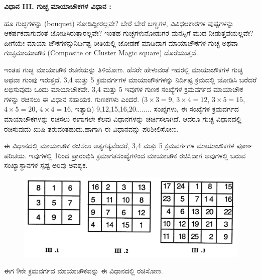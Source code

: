 \newpage

\smallskip
\textbf{ವಿಧಾನ III. ಗುಚ್ಛ ಮಾಯಾಚೌಕಗಳ ವಿಧಾನ :}
\smallskip

ಹೂ ಗುಚ್ಛಗಳನ್ನು (bouquet) ನೋಡಿದ್ದೀರಲ್ಲವೇ? ಬೇರೆ ಬೇರೆ ಬಣ್ಣಗಳ, ವಿವಿಧ\break ಆಕಾರಗಳ ಪುಷ್ಪಗಳನ್ನು ಆಕರ್ಷಕವಾಗುವಂತೆ ಜೋಡಿಸಿರುತ್ತಾರಲ್ಲವೇ? ಇಂತಹ ಗುಚ್ಛಗಳು\break ನೋಡುಗರ ಮನಸ್ಸಿಗೆ ಮುದ ನೀಡುತ್ತವೆಯಲ್ಲವೇ? ಹೀಗೆಯೇ ಮಾಯಾ ಚೌಕ\-ಗಳನ್ನು\break ನಿರ್ದಿಷ್ಟ ರೀತಿಯಲ್ಲಿ ಜೋಡಣೆ ಮಾಡಿದಾಗ ಮಾಯಾಚೌಕಗಳ ಗುಚ್ಛ ಅಥವಾ ಗುಚ್ಛ\break ಮಾಯಾಚೌಕ (Composite or Cluster Magic square) ದೊರೆಯುತ್ತದೆ.

ಇಂತಹ ಗುಚ್ಛ ಮಾಯಾಚೌಕ ರಚನೆಯನ್ನು ತಿಳಿಯೋಣ. ಹೆಸರೇ ಹೇಳುವಂತೆ ಇದರಲ್ಲಿ ಮಾಯಾಚೌಕಗಳ ಗುಚ್ಛ ಅಥವಾ ಗುಂಪು ಇರುತ್ತದೆ. 3,4 ಮತ್ತು 5 ಕ್ರಮವರ್ಗಗಳ ಮಾಯಾಚೌಕಗಳನ್ನು ನಿರ್ದಿಷ್ಟ ಕ್ರಮದಲ್ಲಿ ಜೋಡಿಸಿ ಬರೆದರೆ ಲಭಿಸುವುದು ಒಂದು ಮಾಯಾಚೌಕವೇ. 3,4 ಮತ್ತು 5 ಇವುಗಳ ಗುಣಕ ಸಂಖ್ಯೆಗಳ ಕ್ರಮವರ್ಗದ ಮಾಯಾಚೌಕ ಗಳನ್ನು ರಚಿಸಲು ಈ ವಿಧಾನ ಸಹಾಯಕ. ಗುಣಕಗಳು ಎಂದರೆ. ($3 \times 3=9$, $3 \times 4=12$, $3 \times 5=15$, $4 \times 5= 20$, $4 \times 4=16$, ಇತ್ಯಾದಿ) 9,12,15,16,20........ ಸಂಖ್ಯೆಗಳು, ಈ ಸಂಖ್ಯೆಗಳ ಕ್ರಮವರ್ಗದ ಮಾಯಾಚೌಕಗಳನ್ನು ರಚಿಸಲು ಈಗಾಗಲೇ ಕೆಲವು ವಿಧಾನ\-ಗಳನ್ನು ಚರ್ಚಿಸಲಾಗಿದೆ. ಆದರೂ ಗುಚ್ಛ ವಿಧಾನದಲ್ಲಿ ರಚಿಸುವುದು ಖುಷಿ ತರುವಂತಹುದು.\break ಹಾಗಾಗಿ ಈ ವಿಧಾನವನ್ನು ಪರಿಶೀಲಿಸೋಣ.

ಈ ವಿಧಾನದಲ್ಲಿ ಮಾಯಾಚೌಕ ರಚಿಸಲು ಅತ್ಯಗತ್ಯವೆಂದರೆ, 3,4 ಮತ್ತು 5 ಕ್ರಮ\-ವರ್ಗ\-ಗಳ ಮಾಯಾಚೌಕಗಳ ಪೂರ್ಣ ಪರಿಚಯ. ಇವುಗಳಲ್ಲಿ 1ರಿಂದ ಪ್ರಾರಂಭಿಸಿ ಕ್ರಮಾಗತ\break ಸಂಖ್ಯೆಗಳಿಂದ ಮಾಯಾಚೌಕ ರಚಿಸಿದಾಗ ಅವುಗಳಲ್ಲಿ ಬರುವ ಸಂಖ್ಯಾಸ್ಥಾನಗಳ ಸ್ಪಷ್ಟ ಅರಿವು ಅವಶ್ಯಕ.
\begin{figure}[h]
\includegraphics[scale=.75]{src/figures/chap3/fig3.30.jpg}
\end{figure}

ಈಗ 9ನೇ ಕ್ರಮವರ್ಗದ ಮಾಯಾಚೌಕವನ್ನು ಈ ವಿಧಾನದಲ್ಲಿ ರಚಿಸೋಣ.

